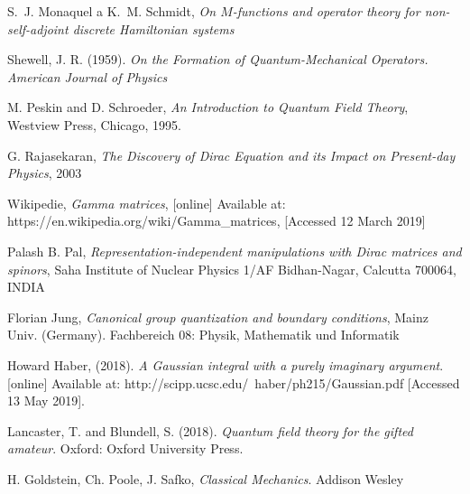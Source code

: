 \begin{thebibliography}{10}

    S.~J. Monaquel a K.~M. Schmidt, \textit{On $M$-functions and operator
      theory for non-self-adjoint discrete Hamiltonian systems}

        Shewell, J. R. (1959). \textit{On the Formation of Quantum-Mechanical 
        Operators. American Journal of Physics}

        M. Peskin and D. Schroeder, \textit{An Introduction to Quantum Field Theory},
        Westview Press, Chicago, 1995.

        G. Rajasekaran, \textit{The Discovery of Dirac Equation and its Impact on Present-day Physics},
        2003

        Wikipedie, \textit{Gamma matrices},
        [online] Available at: https://en.wikipedia.org/wiki/Gamma\_matrices, [Accessed 12 March 2019]

        Palash B. Pal, \textit{Representation-independent manipulations with Dirac matrices and spinors},
        Saha Institute of Nuclear Physics 1/AF Bidhan-Nagar, Calcutta 700064, INDIA

        Florian Jung, \textit{Canonical group quantization and boundary conditions},
        Mainz Univ. (Germany). Fachbereich 08: Physik, Mathematik und Informatik

        Howard Haber, (2018). \textit{A Gaussian integral with a purely imaginary argument}. 
        [online] Available at: http://scipp.ucsc.edu/~haber/ph215/Gaussian.pdf [Accessed 13 May 2019].

        Lancaster, T. and Blundell, S. (2018). \textit{Quantum field theory for the gifted amateur}. 
        Oxford: Oxford University Press.

        H. Goldstein, Ch. Poole, J. Safko, \textit{Classical Mechanics}. 
        Addison Wesley
\end{thebibliography}

\cleardoublepage
